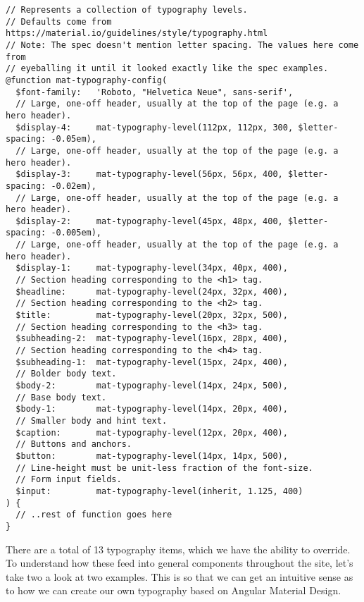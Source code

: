 \begin{lstlisting}[caption=@angular/material/\_theming.scss]
// Represents a collection of typography levels.
// Defaults come from https://material.io/guidelines/style/typography.html
// Note: The spec doesn't mention letter spacing. The values here come from
// eyeballing it until it looked exactly like the spec examples.
@function mat-typography-config(
  $font-family:   'Roboto, "Helvetica Neue", sans-serif',
  // Large, one-off header, usually at the top of the page (e.g. a hero header).
  $display-4:     mat-typography-level(112px, 112px, 300, $letter-spacing: -0.05em),
  // Large, one-off header, usually at the top of the page (e.g. a hero header).
  $display-3:     mat-typography-level(56px, 56px, 400, $letter-spacing: -0.02em),
  // Large, one-off header, usually at the top of the page (e.g. a hero header).
  $display-2:     mat-typography-level(45px, 48px, 400, $letter-spacing: -0.005em),
  // Large, one-off header, usually at the top of the page (e.g. a hero header).
  $display-1:     mat-typography-level(34px, 40px, 400),
  // Section heading corresponding to the <h1> tag.
  $headline:      mat-typography-level(24px, 32px, 400),
  // Section heading corresponding to the <h2> tag.
  $title:         mat-typography-level(20px, 32px, 500),
  // Section heading corresponding to the <h3> tag.
  $subheading-2:  mat-typography-level(16px, 28px, 400),
  // Section heading corresponding to the <h4> tag.
  $subheading-1:  mat-typography-level(15px, 24px, 400),
  // Bolder body text.
  $body-2:        mat-typography-level(14px, 24px, 500),
  // Base body text.
  $body-1:        mat-typography-level(14px, 20px, 400),
  // Smaller body and hint text.
  $caption:       mat-typography-level(12px, 20px, 400),
  // Buttons and anchors.
  $button:        mat-typography-level(14px, 14px, 500),
  // Line-height must be unit-less fraction of the font-size.
  // Form input fields.
  $input:         mat-typography-level(inherit, 1.125, 400)
) {
  // ..rest of function goes here
}  
\end{lstlisting}

There are a total of 13 typography items, which we have the ability to override. 
To understand how these feed into general components throughout the site, 
let's take two a look at two examples. This is so that we can get an intuitive 
sense as to how we can create our own typography based on Angular Material 
Design. 

